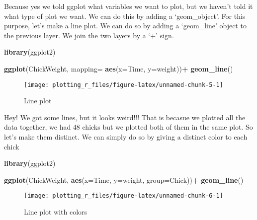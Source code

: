 \documentclass[
]{book}
\newenvironment{Shaded}{\begin{snugshade}}{\end{snugshade}}
\newcommand{\DataTypeTok}[1]{\textcolor[rgb]{0.13,0.29,0.53}{#1}}
\newcommand{\KeywordTok}[1]{\textcolor[rgb]{0.13,0.29,0.53}{\textbf{#1}}}
\newcommand{\NormalTok}[1]{#1}
\newcommand{\OperatorTok}[1]{\textcolor[rgb]{0.81,0.36,0.00}{\textbf{#1}}}
\newcommand{\StringTok}[1]{\textcolor[rgb]{0.31,0.60,0.02}{#1}}
\begin{document}
Because yes we told ggplot what variables we want to plot, but we haven't told it what type of plot we want.
We can do this by adding a `geom\_object'. For this purpose, let's make a line plot. We can do so by adding a `geom\_line' object to the previous layer. We join the two layers by a `+' sign.

\begin{Shaded}
\begin{Highlighting}[]
\KeywordTok{library}\NormalTok{(ggplot2)}

\KeywordTok{ggplot}\NormalTok{(ChickWeight, }\DataTypeTok{mapping=} \KeywordTok{aes}\NormalTok{(}\DataTypeTok{x=}\NormalTok{Time, }\DataTypeTok{y=}\NormalTok{weight))}\OperatorTok{+}
\StringTok{  }\KeywordTok{geom_line}\NormalTok{()}
\end{Highlighting}
\end{Shaded}

\begin{figure}

{\centering \texttt{[image: plotting\_r\_files/figure-latex/unnamed-chunk-5-1]} 

}

\caption{Line plot}\label{fig:unnamed-chunk-5}
\end{figure}

Hey! We got some lines, but it looks weird!!!
That is becasue we plotted all the data together, we had 48 chicks but we plotted both of them in the same plot. So let's make them distinct. We can simply do so by giving a distinct color to each chick

\begin{Shaded}
\begin{Highlighting}[]
\KeywordTok{library}\NormalTok{(ggplot2)}

\KeywordTok{ggplot}\NormalTok{(ChickWeight, }\KeywordTok{aes}\NormalTok{(}\DataTypeTok{x=}\NormalTok{Time, }\DataTypeTok{y=}\NormalTok{weight, }\DataTypeTok{group=}\NormalTok{Chick))}\OperatorTok{+}
\StringTok{  }\KeywordTok{geom_line}\NormalTok{()}
\end{Highlighting}
\end{Shaded}

\begin{figure}

{\centering \texttt{[image: plotting\_r\_files/figure-latex/unnamed-chunk-6-1]} 

}

\caption{Line plot with colors}\label{fig:unnamed-chunk-6}
\end{figure}
\end{document}
